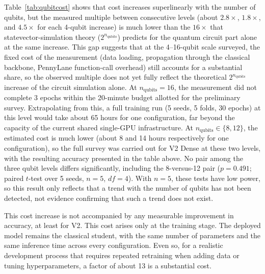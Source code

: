 Table~\ref{tab:qubitcost} shows that cost increases superlinearly
with the number of qubits, but the measured multiple between
consecutive levels (about $2.8\times$, $1.8\times$, and $4.5\times$
for each 4-qubit increase) is much lower than the $16\times$ that
statevector-simulation theory ($2^{n_{\text{qubits}}}$) predicts for
the quantum circuit part alone at the same increase. This gap
suggests that at the 4--16-qubit scale surveyed, the fixed cost of
the measurement (data loading, propagation through the classical
backbone, PennyLane function-call overhead) still accounts for a
substantial share, so the observed multiple does not yet fully
reflect the theoretical $2^{n_{\text{qubits}}}$ increase of the
circuit simulation alone. At $n_{\text{qubits}}=16$, the measurement
did not complete 3 epochs within the 20-minute budget allotted for
the preliminary survey. Extrapolating from this, a full training run
(5 seeds, 5 folds, 30 epochs) at this level would take about 65
hours for one configuration, far beyond the capacity of the current
shared single-GPU infrastructure. At $n_{\text{qubits}} \in \{8,
12\}$, the estimated cost is much lower (about 8 and 14 hours
respectively for one configuration), so the full survey was carried
out for V2 Dense at these two levels, with the resulting accuracy
presented in the table above. No pair among the three qubit levels
differs significantly, including the 8-versus-12 pair ($p=0.491$;
paired $t$-test over 5 seeds, $n=5$, $df=4$). With $n=5$, these
tests have low power, so this result only reflects that a trend
with the number of qubits has not been detected, not evidence
confirming that such a trend does not exist.

This cost increase is not accompanied by any measurable improvement
in accuracy, at least for V2. This cost arises only at the training
stage. The deployed model remains the classical student, with the
same number of parameters and the same inference time across every
configuration. Even so, for a realistic development process that
requires repeated retraining when adding data or tuning
hyperparameters, a factor of about 13 is a substantial cost.

